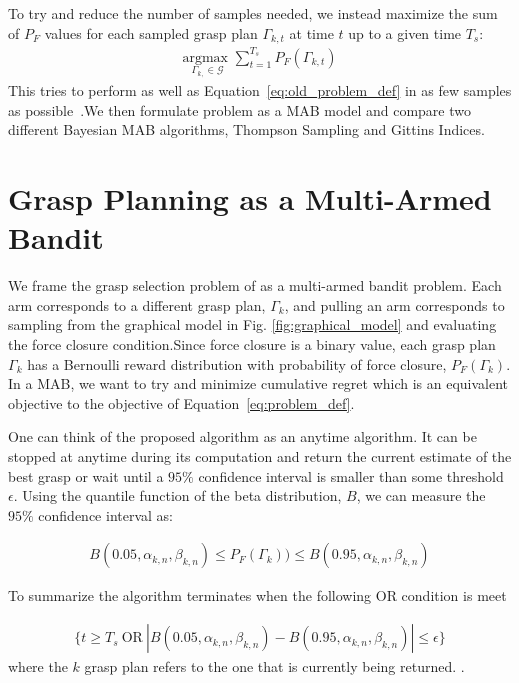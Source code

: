 \documentclass[10pt, conference]{ieeeconf}      %
\newcommand{\mG}{\mathcal{G}}
\begin{document}
To try and reduce the number of samples needed, we instead maximize the sum of $P_F$ values for each sampled grasp plan $\Gamma_{k,t}$ at time $t$ up to a given time $T_s$:
\begin{align}
    \underset{\Gamma_{k,} \in \mG}{\text{argmax }} \sum \limits_{t=1}^
    {T_s} P_F \left( \Gamma_{k,t}\right)  \label{eq:problem_def}
\end{align}
\noindent This tries to perform as well as Equation~\ref{eq:old_problem_def} in as few samples as possible~\cite{srinivas2009gaussian}.We then formulate  problem as a MAB model and compare two different Bayesian MAB algorithms, Thompson Sampling and Gittins Indices.

\section{Grasp Planning as a Multi-Armed Bandit}
We frame the grasp selection problem of  as a multi-armed bandit problem.
Each arm corresponds to a different grasp plan, $\Gamma_k$, and pulling an arm corresponds to sampling from the graphical model in Fig. \ref{fig:graphical_model} and evaluating the force closure condition.Since force closure is a binary value, each grasp plan $\Gamma_k$ has a Bernoulli reward distribution with probability of force closure, $P_F(\Gamma_k)$.
In a MAB, we want to try and minimize cumulative regret which is an equivalent objective to the objective of Equation~\ref{eq:problem_def}.

One can think of the proposed algorithm as an anytime algorithm. It can be stopped at anytime during its computation and return the current estimate of the best grasp or wait until a $95\%$ confidence interval is smaller than some threshold $\epsilon$. Using the quantile function of the beta distribution, $B$, we can measure the $95\%$ confidence interval as: 

\vspace{-2ex}
\begin{align}\label{eq:confidence}
B(0.05,\alpha_{k,n},\beta_{k,n}) \leq P_F(\Gamma_k)) \leq B(0.95,\alpha_{k,n},\beta_{k,n})
\end{align}

To summarize the algorithm terminates when the following OR condition is meet 

\vspace{-2ex}
\begin{align}\label{eq:stopping_condition}
\lbrace t \geq T_s \: \mbox{OR} \: |B(0.05,\alpha_{k,n},\beta_{k,n}) -  B(0.95,\alpha_{k,n},\beta_{k,n})| \leq \epsilon \rbrace
\end{align}
where the $k$ grasp plan refers to the one that is currently being returned. 
 .
\end{document}
